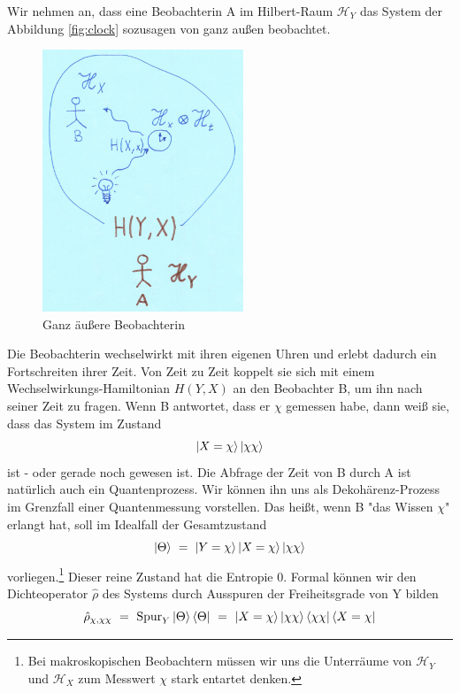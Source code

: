 \documentclass[12pt]{article}
\begin{document}
Wir nehmen an, dass eine Beobachterin A im Hilbert-Raum $\mathscr{H}_Y$ das System der Abbildung \ref{fig:clock} sozusagen von ganz außen beobachtet. 
\begin{figure}[!h]\begin{center}
  \includegraphics[width=6cm]{Entropie.png}
  \caption{Ganz äußere Beobachterin}
  \label{fig:entropy}
\end{center}\end{figure}
Die Beobachterin wechselwirkt mit ihren eigenen Uhren und erlebt dadurch ein Fortschreiten ihrer Zeit. Von Zeit zu Zeit koppelt sie sich mit einem Wechselwirkungs-Hamiltonian $H(Y,X)$ an den Beobachter B, um ihn nach seiner Zeit zu fragen. Wenn B antwortet, dass er $\chi$ gemessen habe, dann weiß sie, dass das System im Zustand 
\begin{equation}
\ket{X=\chi}\ket{\chi\chi}
\end{equation}
ist - oder gerade noch gewesen ist. Die Abfrage der Zeit von B durch A ist natürlich auch ein Quantenprozess. Wir können ihn uns als Dekohärenz-Prozess im Grenzfall einer Quantenmessung vorstellen. Das heißt, wenn B "das Wissen $\chi$" erlangt hat, soll im Idealfall der Gesamtzustand
\begin{equation}
\ket{\Theta}\ =\ \ket{Y=\chi}\ket{X=\chi}\ket{\chi\chi}
\end{equation}
vorliegen.\footnote{Bei makroskopischen Beobachtern müssen wir uns die Unterräume von $\mathscr{H}_Y$ und $\mathscr{H}_X$ zum Messwert $\chi$ stark entartet denken.}  Dieser reine Zustand hat die Entropie 0. Formal können wir den Dichteoperator $\hat{\rho}$ des Systems durch Ausspuren der Freiheitsgrade von Y bilden
\begin{equation}
\hat{\rho}_{\chi,\chi\chi}\ =\ \operatorname{Spur}_Y \ket{\Theta}\bra{\Theta}\ =\ 
\ket{X=\chi}\ket{\chi\chi} \bra{\chi\chi}\bra{X=\chi} 
\end{equation}
\end{document}
